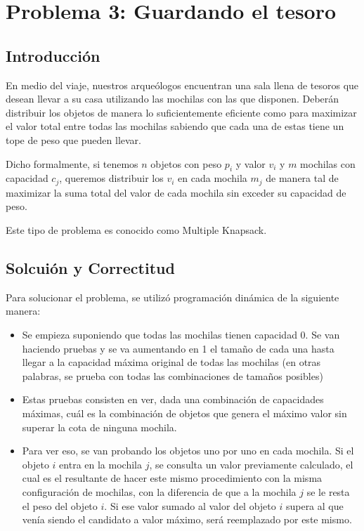 \section{Problema 3: Guardando el tesoro}

\subsection{Introducción}

En medio del viaje, nuestros arqueólogos encuentran una sala llena de tesoros que desean llevar a su casa utilizando las mochilas con las que disponen. Deberán distribuir los objetos de manera lo suficientemente eficiente como para maximizar el valor total entre todas las mochilas sabiendo que cada una de estas tiene un tope de peso que pueden llevar.

Dicho formalmente, si tenemos $n$ objetos con peso $p_i$ y valor $v_i$ y $m$ mochilas con capacidad $c_j$, queremos distribuir los $v_i$ en cada mochila $m_j$ de manera tal de maximizar la suma total del valor de cada mochila sin exceder su capacidad de peso.

Este tipo de problema es conocido como Multiple Knapsack.

\subsection{Solcuión y Correctitud}

Para solucionar el problema, se utilizó programación dinámica de la siguiente manera:

\begin{itemize}
\item Se empieza suponiendo que todas las mochilas tienen capacidad 0. Se van haciendo pruebas y se va aumentando en 1 el tamaño de cada una hasta llegar a la capacidad máxima original de todas las mochilas (en otras palabras, se prueba con todas las combinaciones de tamaños posibles)
\item Estas pruebas consisten en ver, dada una combinación de capacidades máximas, cuál es la combinación de objetos que genera el máximo valor sin superar la cota de ninguna mochila.
\item Para ver eso, se van probando los objetos uno por uno en cada mochila. Si el objeto $i$ entra en la mochila $j$, se consulta un valor previamente calculado, el cual es el resultante de hacer este mismo procedimiento con la misma configuración de mochilas, con la diferencia de que a la mochila $j$ se le resta el peso del objeto $i$. Si ese valor sumado al valor del objeto $i$ supera al que venía siendo el candidato a valor máximo, será reemplazado por este mismo.
\end{itemize}

